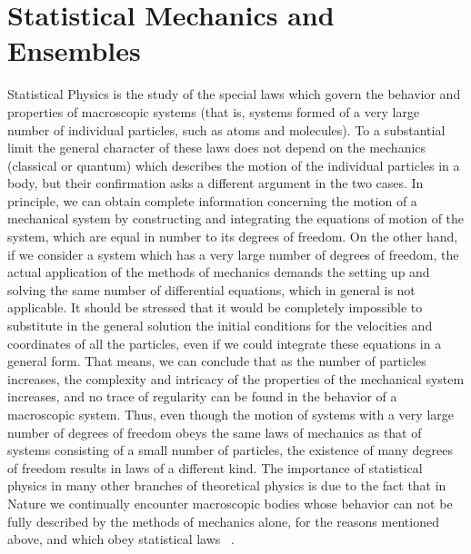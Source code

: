 \section{Statistical Mechanics and  Ensembles} 
Statistical Physics is the study of the special laws which govern the behavior and properties of macroscopic systems (that is, systems formed of a very large number of individual particles, such as atoms and molecules). To a substantial limit the general character of these laws does not depend on the mechanics (classical or quantum) which describes the motion of the individual particles in a body, but their confirmation asks a different argument in the two cases. In principle, we can obtain complete information concerning the motion of a mechanical system by constructing and integrating the equations of motion of the system, which are equal in number to its degrees of freedom. On the other hand,  if we consider a system which has a very large number of degrees of freedom, the actual application of the methods of mechanics demands the setting up and solving the same number of differential equations, which in general is not applicable. It should be stressed that it would be completely impossible to substitute in the general solution the initial conditions for the velocities and coordinates of all the particles, even if we could integrate these equations in a general form. That means, we can conclude that as the number of particles increases, the complexity and intricacy of the properties of the mechanical system increases, and  no trace of regularity can be found in the behavior of a macroscopic system. Thus, even though the motion of systems with a very large number of degrees of freedom obeys the same laws of mechanics as that of systems consisting of a small number of particles, the existence of many degrees of freedom results in laws of a different kind. The importance of statistical physics in many other branches of theoretical  physics is due to the fact that in Nature we continually encounter macroscopic bodies whose behavior can not be fully described by the methods of mechanics alone, for the reasons mentioned above, and which obey statistical laws ~\citep{Landau1980}.
